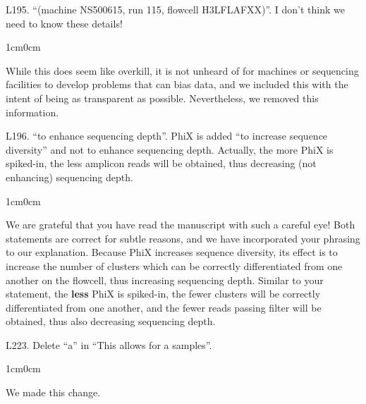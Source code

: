 \documentclass{article}
\newenvironment{response}
	{
	\begin{adjustwidth}{1cm}{0cm}
	\color{peerjBlue}
	}
	{
	\end{adjustwidth}
	}
\begin{document}
L195. ``(machine NS500615, run 115, flowcell H3LFLAFXX)''. I don't think we need to know these details!
\begin{response}
  While this does seem like overkill, it is not unheard of for machines or sequencing facilities to develop problems that can bias data, and we included this with the intent of being as transparent as possible. Nevertheless, we removed this information.\\
\end{response}

L196. ``to enhance sequencing depth''. PhiX is added ``to increase sequence diversity'' and not to enhance sequencing depth. Actually, the more PhiX is spiked-in, the less amplicon reads will be obtained, thus decreasing (not enhancing) sequencing depth.
\begin{response}
  We are grateful that you have read the manuscript with such a careful eye!
	Both statements are correct for subtle reasons, and we have incorporated your phrasing to our explanation.
	Because PhiX increases sequence diversity, its effect is to increase the number of clusters which can be correctly differentiated from one another on the flowcell, thus increasing sequencing depth.
	Similar to your statement, the \textbf{less} PhiX is spiked-in, the fewer clusters will be correctly differentiated from one another, and the fewer reads passing filter will be obtained, thus also decreasing sequencing depth.\\
\end{response}

L223. Delete ``a'' in ``This allows for a samples''.
\begin{response}
  We made this change.\\
\end{response}
\end{document}
